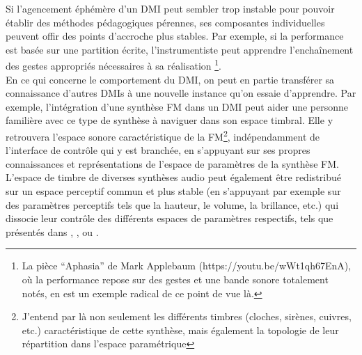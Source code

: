 \noindent Si l'agencement éphémère d'un \gls{DMI} peut sembler trop instable pour pouvoir établir des méthodes pédagogiques pérennes, ses composantes individuelles peuvent offir des points d'accroche plus stables. Par exemple, si la performance est basée sur une partition écrite, l'instrumentiste peut apprendre l'enchaînement des gestes appropriés nécessaires à sa réalisation \footnote{La pièce ``Aphasia'' de Mark Applebaum (https://youtu.be/wWt1qh67EnA), où la performance repose sur des gestes et une bande sonore totalement notés, en est un exemple radical de ce point de vue là.}.\\
\indent En ce qui concerne le comportement du \gls{DMI}, on peut en partie transférer sa connaissance d'autres \glspl{DMI} à une nouvelle instance qu'on essaie d'apprendre. Par exemple, l'intégration d'une synthèse \gls{FM} dans un \gls{DMI} peut aider une personne familière avec ce type de synthèse à naviguer dans son espace timbral. Elle y retrouvera l'espace sonore caractéristique de la \gls{FM}\footnote{J'entend par là non seulement les différents timbres (cloches, sirènes, cuivres, etc.) caractéristique de cette synthèse, mais également la topologie de leur répartition dans l'espace paramétrique}, indépendamment de l'interface de contrôle qui y est branchée, en s'appuyant sur ses propres connaissances et représentations de l'espace de paramètres de la synthèse \gls{FM}. L'espace de timbre de diverses synthèses audio peut également être redistribué sur un espace perceptif commun et plus stable (en s'appuyant par exemple sur des paramètres perceptifs tels que la hauteur, le volume, la brillance, etc.) qui dissocie leur contrôle des différents espaces de paramètres respectifs, tels que présentés dans \cite{wessel_timbre_1979}, \cite{arfib_strategies_2002}, \cite{schwarz_sound_2012} ou \cite{tubb_divergent_2014}.\\

